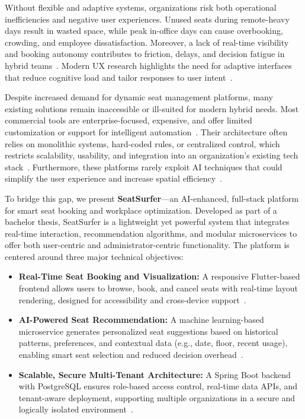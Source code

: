 \documentclass[onecolumn, 12pt]{IEEEtran}
\begin{document}
Without flexible and adaptive systems, organizations risk both operational inefficiencies and negative user experiences. Unused seats during remote-heavy days result in wasted space, while peak in-office days can cause overbooking, crowding, and employee dissatisfaction. Moreover, a lack of real-time visibility and booking autonomy contributes to friction, delays, and decision fatigue in hybrid teams~\cite{andersen2023ux,brown2022usertracking}. Modern UX research highlights the need for adaptive interfaces that reduce cognitive load and tailor responses to user intent~\cite{zhao2023aiux}.

Despite increased demand for dynamic seat management platforms, many existing solutions remain inaccessible or ill-suited for modern hybrid needs. Most commercial tools are enterprise-focused, expensive, and offer limited customization or support for intelligent automation~\cite{lu2022ai}. Their architecture often relies on monolithic systems, hard-coded rules, or centralized control, which restricts scalability, usability, and integration into an organization's existing tech stack~\cite{torres2023micro,huang2023reactive,raza2023microservice}. Furthermore, these platforms rarely exploit AI techniques that could simplify the user experience and increase spatial efficiency~\cite{kamal2024hybridrs}.

To bridge this gap, we present \textbf{SeatSurfer}—an AI-enhanced, full-stack platform for smart seat booking and workplace optimization. Developed as part of a bachelor thesis, SeatSurfer is a lightweight yet powerful system that integrates real-time interaction, recommendation algorithms, and modular microservices to offer both user-centric and administrator-centric functionality. The platform is centered around three major technical objectives:

\begin{itemize}
    \item \textbf{Real-Time Seat Booking and Visualization:} A responsive Flutter-based frontend allows users to browse, book, and cancel seats with real-time layout rendering, designed for accessibility and cross-device support~\cite{garcia2021flutterperf}.
    
    \item \textbf{AI-Powered Seat Recommendation:} A machine learning-based microservice generates personalized seat suggestions based on historical patterns, preferences, and contextual data (e.g., date, floor, recent usage), enabling smart seat selection and reduced decision overhead~\cite{vasudevan2023smart,ali2023survey,cai2022rl,shah2023dlrecsys}.
    
    \item \textbf{Scalable, Secure Multi-Tenant Architecture:} A Spring Boot backend with PostgreSQL ensures role-based access control, real-time data APIs, and tenant-aware deployment, supporting multiple organizations in a secure and logically isolated environment~\cite{khattak2021schemas,freeman2022monitoring,miller2021microservices,nascimento2022safety}.
\end{itemize}
\end{document}
